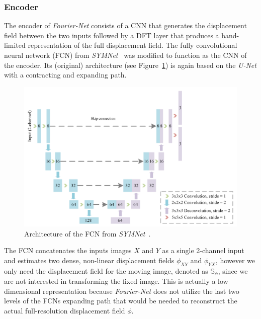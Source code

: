 \documentclass[english,version-2022-01]{uzl-thesis} %
\begin{document}
\subsubsection{Encoder}	\label{SubSubSec:Encoder}
The encoder of \emph{Fourier-Net} consists of a CNN that generates the displacement field between the two inputs followed by a DFT layer that produces a band-limited representation of the full displacement field. The fully convolutional neural network (FCN) from \emph{SYMNet}~\cite{SYM-Net} was modified to function as the CNN of the encoder. Its (original) architecture (see Figure~\ref{fig:SYMNet}) is again based on the \emph{U-Net} with a contracting and expanding path. 
\begin{figure}[htpb]
	\centering
	\graphicspath{{images/}{\main/images/}}
	\includegraphics[width=\linewidth]{SYMNetArchitectureFCN.png} 
	\caption{Architecture of the FCN from \emph{SYMNet}~\cite{SYM-Net}.}
	\label{fig:SYMNet}
\end{figure}
The FCN concatenates the inputs images $X$ and $Y$ as a single 2-channel input and estimates two dense, non-linear displacement fields $\phi_{XY}$ and $\phi_{YX}$, however we only need the displacement field for the moving image, denoted as $\mathbb{S}_\phi$, since we are not interested in transforming the fixed image. This is actually a low dimensional representation because \emph{Fourier-Net} does not utilize the last two levels of the FCNs expanding path that would be needed to reconstruct the actual full-resolution displacement field $\phi$.\\
\end{document}
